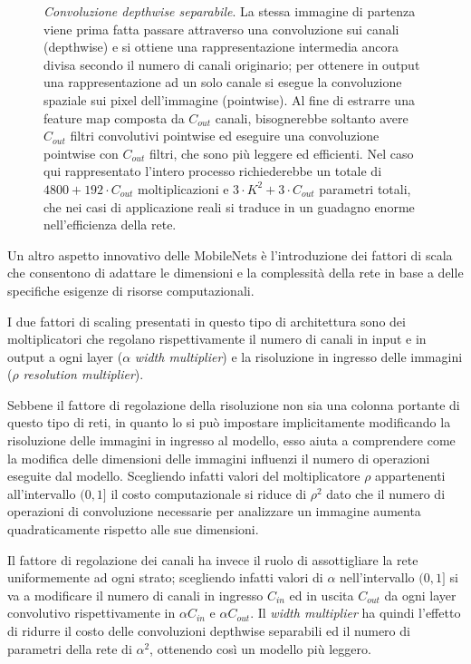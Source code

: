 \begin{figure}[ht!]
    \centering
    \caption{\textit{Convoluzione depthwise separabile}. La stessa immagine di partenza viene prima fatta passare attraverso una convoluzione sui canali (depthwise) e si ottiene una rappresentazione intermedia ancora divisa secondo il numero di canali originario; per ottenere in output una rappresentazione ad un solo canale si esegue la convoluzione spaziale sui pixel dell'immagine (pointwise). Al fine di estrarre una feature map composta da $C_{out}$ canali, bisognerebbe soltanto avere $C_{out}$ filtri convolutivi pointwise ed eseguire una convoluzione pointwise con $C_{out}$ filtri, che sono più leggere ed efficienti. Nel caso qui rappresentato l'intero processo richiederebbe un totale di $4800 + 192\cdot C_{out}$ moltiplicazioni e $3 \cdot K^{2} + 3 \cdot C_{out}$ parametri totali, che nei casi di applicazione reali si traduce in un guadagno enorme nell'efficienza della rete.}
\end{figure}


Un altro aspetto innovativo delle MobileNets è l'introduzione dei fattori di scala che consentono di adattare le dimensioni e la complessità della rete in base a delle specifiche esigenze di risorse computazionali. 

I due fattori di scaling presentati in questo tipo di architettura sono dei moltiplicatori che regolano rispettivamente il numero di canali in input e in output a ogni layer ($\alpha$  \textit{width multiplier}) e la risoluzione in ingresso delle immagini ($\rho$  \textit{resolution multiplier}).

Sebbene il fattore di regolazione della risoluzione non sia una colonna portante di questo tipo di reti, in quanto lo si può impostare implicitamente modificando la risoluzione delle immagini in ingresso al modello, esso aiuta a comprendere come la modifica delle dimensioni delle immagini influenzi il numero di operazioni eseguite dal modello. Scegliendo infatti valori del moltiplicatore $\rho$ appartenenti all'intervallo $(0, 1]$ il  costo computazionale si riduce di $\rho^{2}$ dato che il numero di operazioni di convoluzione necessarie per analizzare un immagine aumenta quadraticamente rispetto alle sue dimensioni.

Il fattore di regolazione dei canali ha invece il ruolo di assottigliare la rete uniformemente ad ogni strato; scegliendo infatti valori di $\alpha$ nell'intervallo $(0, 1]$ si va a modificare il numero di canali in ingresso $C_{in}$ ed in uscita $C_{out}$ da ogni layer convolutivo rispettivamente in $\alpha C_{in}$ e $\alpha C_{out}$. Il \textit{width multiplier} ha quindi l'effetto di ridurre il costo delle convoluzioni depthwise separabili ed il numero di parametri della rete di $\alpha^{2}$, ottenendo così un modello più leggero. 

